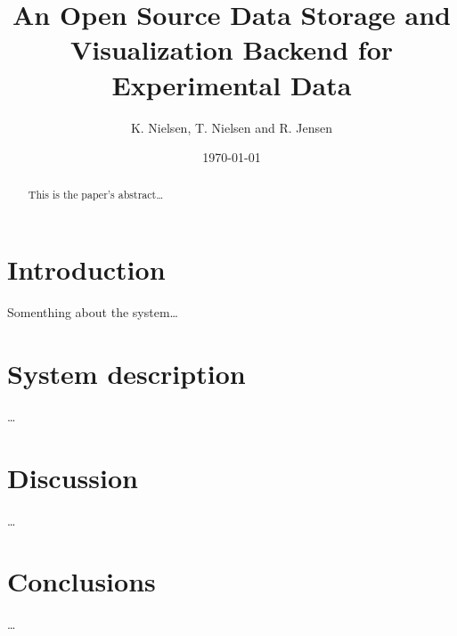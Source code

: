 \documentclass[12pt]{article}
\title{An Open Source Data Storage and Visualization Backend for Experimental
Data}
\author{K. Nielsen, T. Nielsen and R. Jensen} %
\date{\today}
\begin{document}
\doublespacing %
\maketitle

\begin{abstract}
This is the paper's abstract\ldots
\end{abstract}

\section{Introduction}
Somenthing about the system\ldots

\section{System description}
\ldots

\section{Discussion}
\ldots

\section{Conclusions}
\ldots

%
%
\end{document}
